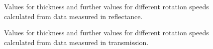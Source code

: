 \begin{figure}[h]
    
    \caption{Values for thickness and further values for different rotation speeds calculated from data measured in reflectance.}
    \label{tab:RotThickRef}
\end{figure}

\begin{figure}[h]
    
    \caption{Values for thickness and further values for different rotation speeds calculated from data measured in transmission.}
    \label{tab:RotThickTrans}
\end{figure}